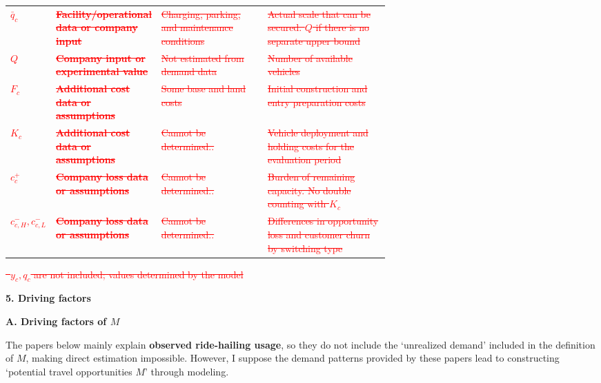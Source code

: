 \documentclass[10pt,a4paper]{article}
\newcommand{\hd}[1]{\par\vspace{8pt}\textbf{#1}\par\vspace{3pt}}
\newcommand{\note}{\textreferencemark\ }
\begin{document}
{\begin{tabularx}{\linewidth}{@{}>{\raggedright\arraybackslash}p{0.1\linewidth}>{\raggedright\arraybackslash}p{0.25\linewidth}>{\raggedright\arraybackslash}p{0.29\linewidth}Y@{}}
\textcolor{red}{\sout{$\bar q_c$}} & \textcolor{red}{\textbf{\sout{Facility/operational data or company input}}} & \textcolor{red}{\sout{Charging, parking, and maintenance conditions}} & \textcolor{red}{\sout{Actual scale that can be secured. $Q$ if there is no separate upper bound}} \\
\textcolor{red}{\sout{$Q$}} & \textcolor{red}{\textbf{\sout{Company input or experimental value}}} & \textcolor{red}{\sout{Not estimated from demand data}} & \textcolor{red}{\sout{Number of available vehicles}} \\
\textcolor{red}{\sout{$F_c$}} & \textcolor{red}{\textbf{\sout{Additional cost data or assumptions}}} & \textcolor{red}{\sout{Some base and land costs}} & \textcolor{red}{\sout{Initial construction and entry preparation costs}} \\
\textcolor{red}{\sout{$K_c$}} & \textcolor{red}{\textbf{\sout{Additional cost data or assumptions}}} & \textcolor{red}{\sout{Cannot be determined..}} & \textcolor{red}{\sout{Vehicle deployment and holding costs for the evaluation period}} \\
\textcolor{red}{\sout{$c_c^+$}} & \textcolor{red}{\textbf{\sout{Company loss data or assumptions}}} & \textcolor{red}{\sout{Cannot be determined..}} & \textcolor{red}{\sout{Burden of remaining capacity. No double counting with $K_c$}} \\
\textcolor{red}{\sout{$c_{c,H}^-,c_{c,L}^-$}} & \textcolor{red}{\textbf{\sout{Company loss data or assumptions}}} & \textcolor{red}{\sout{Cannot be determined..}} & \textcolor{red}{\sout{Differences in opportunity loss and customer churn by switching type}} \\
\bottomrule
\end{tabularx}
}

\textcolor{red}{\sout{\note{$y_c,q_c$ are not included; values determined by the model}}}

\newpage
\hd{5. Driving factors}
\hd{A. Driving factors of $M$}
The papers below mainly explain \textbf{observed ride-hailing usage}, so they do not include the `unrealized demand' included in the definition of $M$, making direct estimation impossible. However, I suppose the demand patterns provided by these papers lead to constructing `potential travel opportunities $M$' through modeling.
\end{document}
